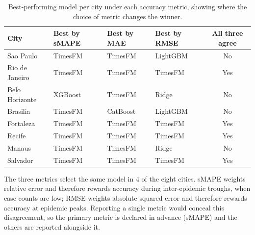 \begin{table}[htbp]
\centering
\small
\caption{Best-performing model per city under each accuracy metric, showing where the
choice of metric changes the winner.}
\label{tab:metric-disagreement}
\begin{tabular}{llllc}
\toprule
City & Best by sMAPE & Best by MAE & Best by RMSE & All three agree \\
\midrule
Sao Paulo & TimesFM & TimesFM & LightGBM & No \\
Rio de Janeiro & TimesFM & TimesFM & TimesFM & Yes \\
Belo Horizonte & XGBoost & TimesFM & Ridge & No \\
Brasilia & TimesFM & CatBoost & LightGBM & No \\
Fortaleza & TimesFM & TimesFM & TimesFM & Yes \\
Recife & TimesFM & TimesFM & TimesFM & Yes \\
Manaus & TimesFM & TimesFM & Ridge & No \\
Salvador & TimesFM & TimesFM & TimesFM & Yes \\
\bottomrule
\end{tabular}

\vspace{0.5em}
\begin{minipage}{\textwidth}
\footnotesize
The three metrics select the same model in 4 of the eight cities. sMAPE weights
relative error and therefore rewards accuracy during inter-epidemic troughs, when case
counts are low; RMSE weights absolute squared error and therefore rewards accuracy at
epidemic peaks. Reporting a single metric would conceal this disagreement, so the
primary metric is declared in advance (sMAPE) and the others are reported alongside it.
\end{minipage}
\end{table}
